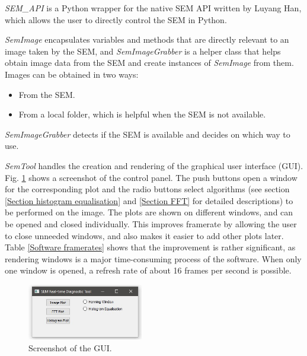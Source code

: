 \documentclass[12pt, conference]{IEEEtran}
\begin{document}
\textit{SEM\_API} is a Python wrapper for the native SEM API written by Luyang Han, which allows the user to directly control the SEM in Python.

\textit{SemImage} encapsulates variables and methods that are directly relevant to an image taken by the SEM, and \textit{SemImageGrabber} is a helper class that helps obtain image data from the SEM and create instances of \textit{SemImage} from them. Images can be obtained in two ways:
\begin{itemize}
    \item From the SEM.
    \item From a local folder, which is helpful when the SEM is not available.
\end{itemize}
\textit{SemImageGrabber} detects if the SEM is available and decides on which way to use.

\textit{SemTool} handles the creation and rendering of the graphical user interface (GUI). Fig. \ref{Software GUI} shows a screenshot of the control panel. The push buttons open a window for the corresponding plot and the radio buttons select algorithms (see section \ref{Section histogram equalisation} and \ref{Section FFT} for detailed descriptions) to be performed on the image. The plots are shown on different windows, and can be opened and closed individually. This improves framerate by allowing the user to close unneeded windows, and also makes it easier to add other plots later. Table \ref{Software framerates} shows that the improvement is rather significant, as rendering windows is a major time-consuming process of the software. When only one window is opened, a refresh rate of about 16 frames per second is possible.

\begin{figure}[htbp]
    \centering
    \includegraphics[width=0.45\textwidth]{Images/Software screenshot.jpg}
    \caption{Screenshot of the GUI.}
    \label{Software GUI}
\end{figure}
\end{document}
